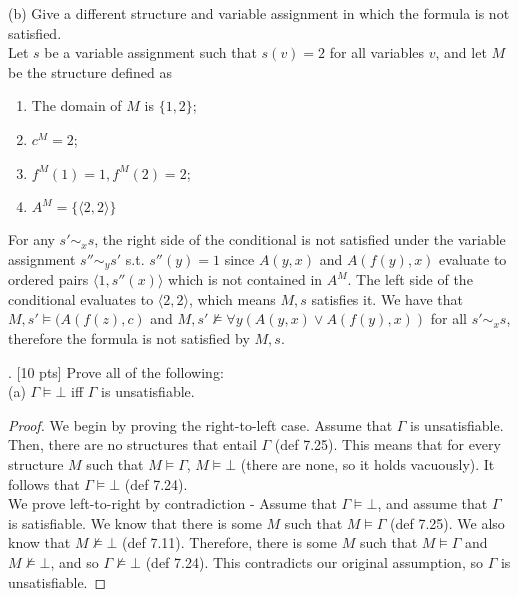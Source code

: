 \documentclass[11pt]{article}
\begin{document}
\noindent
(b) Give a different structure and variable assignment in which the formula is not satisfied. \\

\color{RoyalBlue}
\noindent
Let $s$ be a variable assignment such that $s(v)=2$ for all variables $v$, and let $M$ be the structure defined as

\begin{enumerate}
\item The domain of $M$ is $\{1,2\}$;
\item $c^M = 2$;
\item $f^M(1) = 1, f^M(2) = 2$;
\item $A^M = \{\langle2,2\rangle\}$
\end{enumerate}

\noindent
For any $s'\sim_x s$, the right side of the conditional is not satisfied under the variable assignment $s''\sim_y s'$ s.t. $s''(y)=1$ since $A(y,x)$ and $A(f(y),x)$ evaluate to ordered pairs $\langle1, s''(x)\rangle$ which is not contained in $A^M$. The left side of the conditional evaluates to $\langle2,2\rangle$, which means $M, s$ satisfies it. We have that $M,s' \models (A(f(z), c)$ and $M,s' \not\models \forall y(A(y,x) \vee A(f(y),x))$ for all $s' \sim_x s$, therefore the formula is not satisfied by $M, s$.
\\
\color{black}

. [10 pts] Prove all of the following: \\

\noindent
(a) $\Gamma \models \bot$ iff $\Gamma$ is unsatisfiable.
\color{RoyalBlue}
\begin{proof}
We begin by proving the right-to-left case. Assume that $\Gamma$ is unsatisfiable. Then, there are no structures that entail $\Gamma$ (def 7.25). This means that for every structure $M$ such that $M \models \Gamma$, $M \models \bot$ (there are none, so it holds vacuously). It follows that $\Gamma \models \bot$ (def 7.24). \\

\noindent
We prove left-to-right by contradiction - Assume that $\Gamma \models \bot$, and assume that $\Gamma$ is satisfiable. We know that there is some $M$ such that $M \models \Gamma$ (def 7.25). We also know that $M \not\models \bot$ (def 7.11). Therefore, there is some $M$ such that $M \models \Gamma$ and $M \not\models \bot$, and so $\Gamma \not\models \bot$ (def 7.24). This contradicts our original assumption, so $\Gamma$ is unsatisfiable.
\end{proof}
\color{black}
\end{document}
